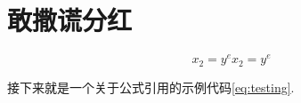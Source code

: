 \chapter{敢撒谎分红}
\zhlipsum[9-11]
\begin{equation}
x_2=y^e x_2=y^e \label{eq:testing}
\end{equation}


接下来就是一个关于公式引用的示例代码\eqref{eq:testing}.

\zhlipsum[10-12]